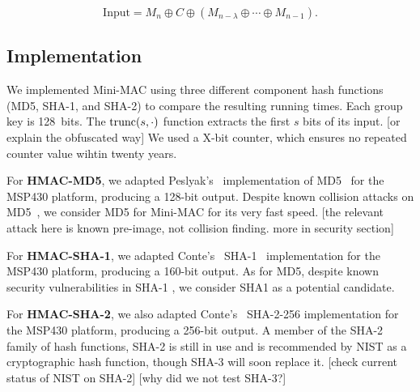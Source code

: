 \begin{equation}
\text{Input} = M_n \oplus C \oplus (M_{n-{\lambda}} \oplus \cdots \oplus M_{n-1}) .
\end{equation}


%


\subsection{Implementation}
\label{implementation}

We implemented Mini-MAC using three different component hash functions (MD5, SHA-1, and SHA-2) to compare the resulting running times.  
Each group key is 128~bits.  The $\hbox{trunc}(s,\cdot)$ function extracts the first $s$ bits of its input. [or explain the obfuscated way]
We used a X-bit counter, which ensures no repeated counter value wihtin twenty years.

For \textbf{HMAC-MD5},
we adapted Peslyak's~\cite{Peslyak} implementation of MD5~\cite{MD5} for the MSP430 platform, producing a 128-bit output. 
Despite known collision attacks on MD5~\cite{Wang-MD5}, we consider
MD5 for Mini-MAC for its very fast speed.  [the relevant attack here is known pre-image, not
collision finding.  more in security section]

For \textbf{HMAC-SHA-1},
we adapted Conte's~\cite{Conte-SHA1} SHA-1~\cite{FIPS-180-4} implementation for the MSP430 platform, producing a 160-bit output. 
As for MD5, despite known security vulnerabilities in SHA-1 \cite{Wang-SHA1}, 
we consider SHA1 as a potential candidate.

For \textbf{HMAC-SHA-2},
we also adapted Conte's~\cite{Conte-SHA256} SHA-2-256 implementation for the MSP430 platform, producing a 256-bit output. 
A member of the SHA-2 family of hash functions, SHA-2 is still in use and is recommended by NIST as a cryptographic hash function, 
though SHA-3 will soon replace it\cite{FIPS-180-4}. [check current status of NIST on SHA-2]
[why did we not test SHA-3?]